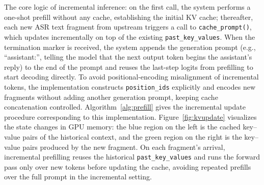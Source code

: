 \documentclass[pdflatex,iicol,Numbered,sn-basic]{sn-jnl}%
\begin{document}
The core logic of incremental inference: on the first call, the system performs a one-shot prefill without any cache, establishing the initial KV cache; thereafter, each new ASR text fragment from upstream triggers a call to \texttt{cache\_prompt()}, which updates incrementally on top of the existing \texttt{past\_key\_values}. When the termination marker is received, the system appends the generation prompt (e.g., ``assistant:'', telling the model that the next output token begins the assistant's reply) to the end of the prompt and reuses the last-step logits from prefilling to start decoding directly. To avoid positional-encoding misalignment of incremental tokens, the implementation constructs \texttt{position\_ids} explicitly and encodes new fragments without adding another generation prompt, keeping cache concatenation controlled. Algorithm~\ref{alg:prefill} gives the incremental update procedure corresponding to this implementation. Figure~\ref{fig:kvupdate} visualizes the state changes in GPU memory: the blue region on the left is the cached key--value pairs of the historical context, and the green region on the right is the key--value pairs produced by the new fragment. On each fragment's arrival, incremental prefilling reuses the historical \texttt{past\_key\_values} and runs the forward pass only over new tokens before updating the cache, avoiding repeated prefills over the full prompt in the incremental setting.
\end{document}

